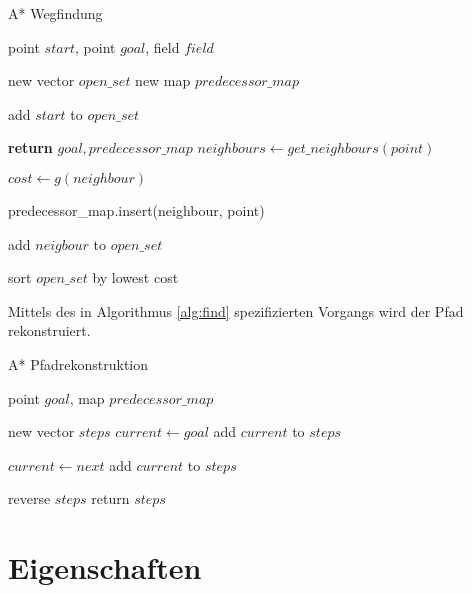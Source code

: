 \documentclass[10pt,twocolumn]{scrartcl}
\begin{document}
\begin{algorithm} 
\caption{A* Wegfindung} 
\label{alg:find} 
\begin{algorithmic}
	\REQUIRE point $start$, point $goal$, field $field$ 	
	
	\STATE new vector $open\_set$
	\STATE new map $predecessor\_map$ 
	
	\STATE add $start$ to $open\_set$
	
	\STATE \textbf{return} $goal, predecessor\_map$	
	\ENDIF
	\STATE $neighbours \leftarrow get\_neighbours(point)$
	
	
	\STATE $cost \leftarrow	g(neighbour)$
	

	\STATE predecessor_map.insert(neighbour, point)
	
	\STATE add $neigbour$ to $open\_set$	
	
	\ENDIF
	
	\STATE sort $open\_set$ by lowest cost		
		
	\ENDFOR
	\ENDWHILE
\end{algorithmic}
\end{algorithm}

Mittels des in Algorithmus \ref{alg:find} spezifizierten Vorgangs wird der Pfad rekonstruiert.

\begin{algorithm} 
\caption{A* Pfadrekonstruktion} 
\label{alg:rec} 
\begin{algorithmic}
	\REQUIRE point $goal$, map $predecessor\_map$
	
	\STATE new vector $steps$	
	\STATE $current \leftarrow goal$
	\STATE add $current$ to $steps$
	
	
	\STATE $current \leftarrow next$
	\STATE add $current$ to $steps$

	\ENDWHILE
	\STATE reverse $steps$
	\STATE return $steps$
	
\end{algorithmic}
\end{algorithm}

\section*{Eigenschaften}
\end{document}
